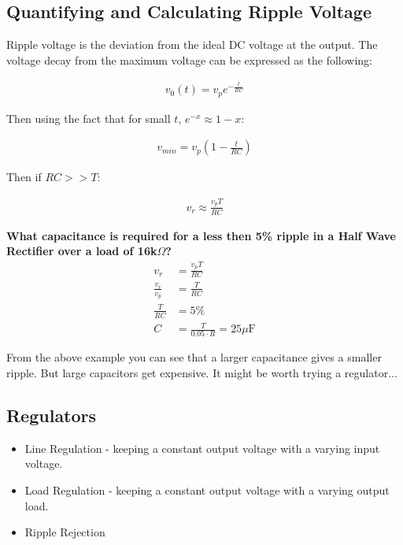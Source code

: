 \subsection{Quantifying and Calculating Ripple Voltage}

Ripple voltage is the deviation from the ideal DC voltage at the output. The voltage decay from the maximum voltage can be expressed as the following:

\begin{gather*}
v_0(t) = v_p e^{-\frac{t}{RC}}
\end{gather*}

Then using the fact that for small $t$, $e^{-x} \approx 1-x$:

\begin{gather*}
v_{min} = v_p\left(1 - \frac{t}{RC}\right)
\end{gather*}

Then if $RC >> T$:

\begin{gather*}
v_r \approx \frac{v_p T}{RC}
\end{gather*}

\begin{framed}
\textbf{What capacitance is required for a less then 5\% ripple in a Half Wave Rectifier over a load of 16k$\Omega$?}
\begin{align*}
v_r &= \frac{v_pT}{RC} \\
\frac{v_r}{v_p} &= \frac{T}{RC} \\
\frac{T}{RC} &= 5\% \\
C &= \frac{T}{0.05 \cdot R} = 25\mu\textrm{F}
\end{align*}
\end{framed}

From the above example you can see that a larger capacitance gives a smaller ripple. But large capacitors get expensive. It might be worth trying a regulator...

\subsection{Regulators}

\begin{itemize}
	\item Line Regulation - keeping a constant output voltage with a varying input voltage.
	\item Load Regulation - keeping a constant output voltage with a varying output load.
	\item Ripple Rejection
\end{itemize}

